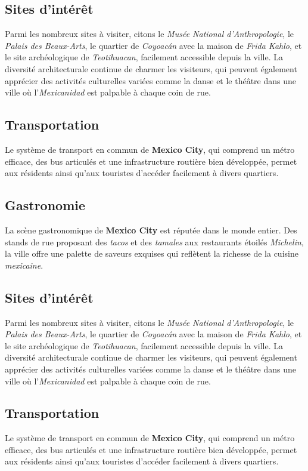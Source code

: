 \documentclass[12pt, a4paper]{article}
\begin{document}
\subsection*{\textbf{Sites d'intérêt}}

Parmi les nombreux sites à visiter, citons le \textit{Musée National d'Anthropologie}, le \textit{Palais des Beaux-Arts}, le quartier de \textit{Coyoacán} avec la maison de \textit{Frida Kahlo}, et le site archéologique de \textit{Teotihuacan}, facilement accessible depuis la ville.
La diversité architecturale continue de charmer les visiteurs, qui peuvent également apprécier des activités culturelles variées comme la danse et le théâtre dans une ville où l'\textit{Mexicanidad} est palpable à chaque coin de rue. \subsection*{\textbf{Transportation}} Le système de transport en commun de \textbf{Mexico City}, qui comprend un métro efficace, des bus articulés et une infrastructure routière bien développée, permet aux résidents ainsi qu'aux touristes d'accéder facilement à divers quartiers.

\subsection*{\textbf{Gastronomie}}

La scène gastronomique de \textbf{Mexico City} est réputée dans le monde entier. Des stands de rue proposant des \textit{tacos} et des \textit{tamales} aux restaurants étoilés \textit{Michelin}, la ville offre une palette de saveurs exquises qui reflètent la richesse de la cuisine \textit{mexicaine}.

\subsection*{\textbf{Sites d'intérêt}}

Parmi les nombreux sites à visiter, citons le \textit{Musée National d'Anthropologie}, le \textit{Palais des Beaux-Arts}, le quartier de \textit{Coyoacán} avec la maison de \textit{Frida Kahlo}, et le site archéologique de \textit{Teotihuacan}, facilement accessible depuis la ville.
La diversité architecturale continue de charmer les visiteurs, qui peuvent également apprécier des activités culturelles variées comme la danse et le théâtre dans une ville où l'\textit{Mexicanidad} est palpable à chaque coin de rue. \subsection*{\textbf{Transportation}} Le système de transport en commun de \textbf{Mexico City}, qui comprend un métro efficace, des bus articulés et une infrastructure routière bien développée, permet aux résidents ainsi qu'aux touristes d'accéder facilement à divers quartiers.
\end{document}
